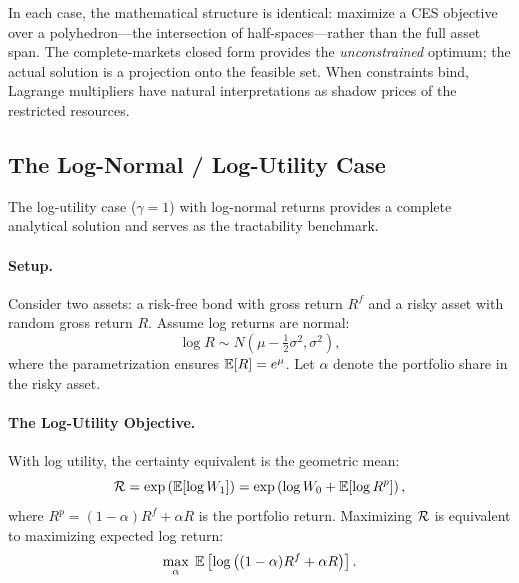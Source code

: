 In each case, the mathematical structure is identical: maximize a CES objective over a polyhedron---the intersection of half-spaces---rather than the full asset span. The complete-markets closed form provides the \emph{unconstrained} optimum; the actual solution is a projection onto the feasible set. When constraints bind, Lagrange multipliers have natural interpretations as shadow prices of the restricted resources.

\subsection{The Log-Normal / Log-Utility Case}
\label{subsec:log-utility}

The log-utility case ($\gamma = 1$) with log-normal returns provides a complete analytical solution and serves as the tractability benchmark.

\paragraph{Setup.}

Consider two assets: a risk-free bond with gross return $R^f$ and a risky asset with random gross return $R$. Assume log returns are normal:
\begin{equation}
\log R \sim N(\mu - \tfrac{1}{2}\sigma^2, \sigma^2),
\label{eq:log-return}
\end{equation}
where the parametrization ensures $\mathbb{E}[R] = e^{\mu}$. Let $\alpha$ denote the portfolio share in the risky asset.

\paragraph{The Log-Utility Objective.}

With log utility, the certainty equivalent is the geometric mean:
\begin{equation}
\mathcal{R} = \exp\left( \mathbb{E}[\log W_1] \right) = \exp\left( \log W_0 + \mathbb{E}[\log R^p] \right),
\label{eq:log-ce}
\end{equation}
where $R^p = (1-\alpha) R^f + \alpha R$ is the portfolio return. Maximizing $\mathcal{R}$ is equivalent to maximizing expected log return:
\begin{equation}
\max_{\alpha} \; \mathbb{E}\left[ \log\left( (1-\alpha) R^f + \alpha R \right) \right].
\label{eq:log-utility-problem}
\end{equation}

